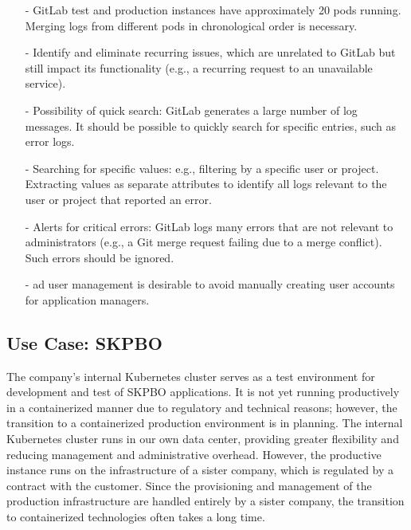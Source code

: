 \documentclass[../main.tex]{subfiles}
\begin{document}
\begin{enumerate}
    \item[-] GitLab test and production instances have approximately 20 pods running. Merging logs from different pods in chronological order is necessary.
    
    \item[-] Identify and eliminate recurring issues, which are unrelated to GitLab but still impact its functionality (e.g., a recurring request to an unavailable service).
    
    \item[-] Possibility of quick search: GitLab generates a large number of log messages. It should be possible to quickly search for specific entries, such as error logs.
    
    \item[-] Searching for specific values: e.g., filtering by a specific user or project. Extracting values as separate attributes to identify all logs relevant to the user or project that reported an error.
    
    \item[-] Alerts for critical errors: GitLab logs many errors that are not relevant to administrators (e.g., a Git merge request failing due to a merge conflict). Such errors should be ignored.
    
    \item[-] \gls{ad} user management is desirable to avoid manually creating user accounts for application managers.
\end{enumerate}

\subsection{Use Case: SKPBO}

The company's internal Kubernetes cluster serves as a test environment for development and test of SKPBO applications. It is not yet running productively in a containerized manner due to regulatory and technical reasons; however, the transition to a containerized production environment is in planning. The internal Kubernetes cluster runs in our own data center, providing greater flexibility and reducing management and administrative overhead. However, the productive instance runs on the infrastructure of a sister company, which is regulated by a contract with the customer. Since the provisioning and management of the production infrastructure are handled entirely by a sister company, the transition to containerized technologies often takes a long time.
\end{document}
